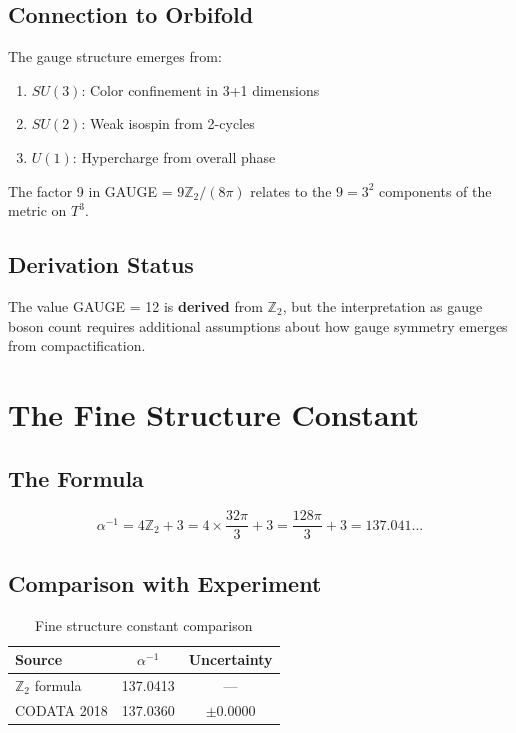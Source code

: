 \documentclass[12pt,a4paper]{article}
\begin{document}
\subsection{Connection to Orbifold}

The gauge structure emerges from:
\begin{enumerate}
    \item $SU(3)$: Color confinement in 3+1 dimensions
    \item $SU(2)$: Weak isospin from 2-cycles
    \item $U(1)$: Hypercharge from overall phase
\end{enumerate}

The factor 9 in GAUGE = $9\mathbb{Z}_2/(8\pi)$ relates to the $9 = 3^2$ components of the metric on $T^3$.

\subsection{Derivation Status}

The value GAUGE = 12 is \textbf{derived} from $\mathbb{Z}_2$, but the interpretation as gauge boson count requires additional assumptions about how gauge symmetry emerges from compactification.

\section{The Fine Structure Constant}

\subsection{The Formula}

\begin{equation}
\alpha^{-1} = 4\mathbb{Z}_2 + 3 = 4 \times \frac{32\pi}{3} + 3 = \frac{128\pi}{3} + 3 = 137.041...
\end{equation}

\subsection{Comparison with Experiment}

\begin{table}[h]
\centering
\begin{tabular}{lcc}
\toprule
Source & $\alpha^{-1}$ & Uncertainty \\
\midrule
$\mathbb{Z}_2$ formula & 137.0413 & --- \\
CODATA 2018 & 137.0360 & $\pm 0.0000$ \\
\bottomrule
\end{tabular}
\caption{Fine structure constant comparison}
\end{table}
\end{document}
